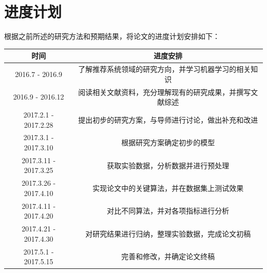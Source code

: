\section{进度计划} 
根据之前所述的研究方法和预期结果，将论文的进度计划安排如下：
\begin{table}[h]
\centering
\label{my-label}
\begin{tabular}{cc}
\hline
\rowcolor[HTML]{EFEFEF} 
\textbf{时间}           & \textbf{进度安排}                \\ \hline
2016.7 - 2016.9       & 了解推荐系统领域的研究方向，并学习机器学习的相关知识   \\ \hline
2016.9 - 2016.12      & 阅读相关文献资料，充分理解现有的研究成果，并撰写文献综述 \\ \hline
2017.2.1 - 2017.2.28  & 提出初步的研究方案，与导师进行讨论，做出补充和改进    \\ \hline
2017.3.1 - 2017.3.10  & 根据研究方案确定初步的模型                \\ \hline
2017.3.11 - 2017.3.25 & 获取实验数据，分析数据并进行预处理            \\ \hline
2017.3.26 - 2017.4.10 & 实现论文中的关键算法，并在数据集上测试效果        \\ \hline
2017.4.11 - 2017.4.20 & 对比不同算法，并对各项指标进行分析            \\ \hline
2017.4.21 - 2017.4.30 & 对研究结果进行归纳，整理实验数据，完成论文初稿      \\ \hline
2017.5.1 - 2017.5.15  & 完善和修改，并确定论文终稿                \\ \hline
\end{tabular}
\end{table}









